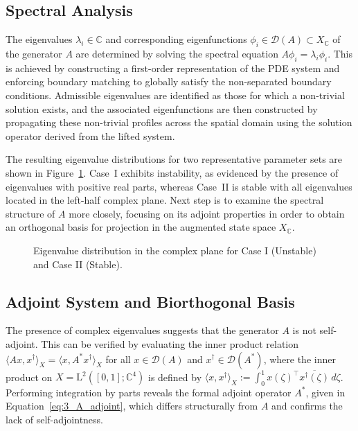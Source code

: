 \subsection{Spectral Analysis} \label{sec:3_3_2_spectral_analysis}

The eigenvalues $\lambda_i \in \mathbb{C}$ and corresponding eigenfunctions $\phi_i \in \mathcal{D}(A) \subset X_\mathbb{C}$ of the generator $A$ are determined by solving the spectral equation $A \phi_i = \lambda_i \phi_i$. This is achieved by constructing a first-order representation of the PDE system and enforcing boundary matching to globally satisfy the non-separated boundary conditions. Admissible eigenvalues are identified as those for which a non-trivial solution exists, and the associated eigenfunctions are then constructed by propagating these non-trivial profiles across the spatial domain using the solution operator derived from the lifted system.

The resulting eigenvalue distributions for two representative parameter sets are shown in Figure~\ref{fig:3_eigvals}. Case~I exhibits instability, as evidenced by the presence of eigenvalues with positive real parts, whereas Case~II is stable with all eigenvalues located in the left-half complex plane. Next step is to examine the spectral structure of $A$ more closely, focusing on its adjoint properties in order to obtain an orthogonal basis for projection in the augmented state space $X_\mathbb{C}$.

\begin{figure}[!htbp]
    \centering
    
    \caption{Eigenvalue distribution in the complex plane for Case I (Unstable) and Case II (Stable).}
    \label{fig:3_eigvals}
\end{figure}

\subsection{Adjoint System and Biorthogonal Basis} \label{sec:3_3_3_adjoint}

The presence of complex eigenvalues suggests that the generator $A$ is not self-adjoint. This can be verified by evaluating the inner product relation $\langle A x, x^\dagger \rangle_X = \langle x, A^* x^\dagger \rangle_X$ for all $x \in \mathcal{D}(A)$ and $x^\dagger \in \mathcal{D}(A^*)$, where the inner product on $X = \mathrm{L}^2([0,1]; \mathbb{C}^4)$ is defined by $\langle x, x^\dagger \rangle_X := \int_0^1 x(\zeta)^\top \overline{x^\dagger(\zeta)}\, d\zeta$. Performing integration by parts reveals the formal adjoint operator $A^*$, given in Equation~\eqref{eq:3_A_adjoint}, which differs structurally from $A$ and confirms the lack of self-adjointness.

